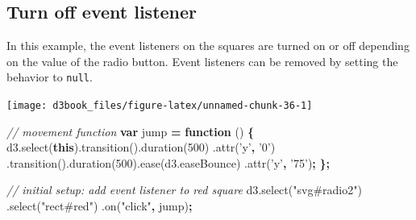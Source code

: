 \documentclass[openany]{book}
\newenvironment{Shaded}{\begin{snugshade}}{\end{snugshade}}
\newcommand{\AttributeTok}[1]{\textcolor[rgb]{0.77,0.63,0.00}{#1}}
\newcommand{\CommentTok}[1]{\textcolor[rgb]{0.56,0.35,0.01}{\textit{#1}}}
\newcommand{\DecValTok}[1]{\textcolor[rgb]{0.00,0.00,0.81}{#1}}
\newcommand{\KeywordTok}[1]{\textcolor[rgb]{0.13,0.29,0.53}{\textbf{#1}}}
\newcommand{\NormalTok}[1]{#1}
\newcommand{\OperatorTok}[1]{\textcolor[rgb]{0.81,0.36,0.00}{\textbf{#1}}}
\newcommand{\StringTok}[1]{\textcolor[rgb]{0.31,0.60,0.02}{#1}}
\newcommand{\VariableTok}[1]{\textcolor[rgb]{0.00,0.00,0.00}{#1}}
\begin{document}
\hypertarget{turn-off-event-listener}{%
\subsection{Turn off event listener}\label{turn-off-event-listener}}

In this example, the event listeners on the squares are turned on or off depending on the value of the radio button. Event listeners can be removed by setting the behavior to \texttt{null}.

\texttt{[image: d3book\_files/figure-latex/unnamed-chunk-36-1]}

\begin{Shaded}
\begin{Highlighting}[]
\CommentTok{// movement function}
\KeywordTok{var}\NormalTok{ jump }\OperatorTok{=} \KeywordTok{function}\NormalTok{ () }\OperatorTok{\{}
      \VariableTok{d3}\NormalTok{.}\AttributeTok{select}\NormalTok{(}\KeywordTok{this}\NormalTok{).}\AttributeTok{transition}\NormalTok{().}\AttributeTok{duration}\NormalTok{(}\DecValTok{500}\NormalTok{)}
\NormalTok{      .}\AttributeTok{attr}\NormalTok{(}\StringTok{'y'}\OperatorTok{,} \StringTok{'0'}\NormalTok{)}
\NormalTok{      .}\AttributeTok{transition}\NormalTok{().}\AttributeTok{duration}\NormalTok{(}\DecValTok{500}\NormalTok{).}\AttributeTok{ease}\NormalTok{(}\VariableTok{d3}\NormalTok{.}\AttributeTok{easeBounce}\NormalTok{)}
\NormalTok{      .}\AttributeTok{attr}\NormalTok{(}\StringTok{'y'}\OperatorTok{,} \StringTok{'75'}\NormalTok{)}\OperatorTok{;}
\OperatorTok{\};}

\CommentTok{// initial setup: add event listener to red square}
\VariableTok{d3}\NormalTok{.}\AttributeTok{select}\NormalTok{(}\StringTok{"svg#radio2"}\NormalTok{)}
\NormalTok{  .}\AttributeTok{select}\NormalTok{(}\StringTok{"rect#red"}\NormalTok{)}
\NormalTok{  .}\AttributeTok{on}\NormalTok{(}\StringTok{"click"}\OperatorTok{,}\NormalTok{ jump)}\OperatorTok{;}
    

\end{Highlighting}
\end{Shaded}
\end{document}
